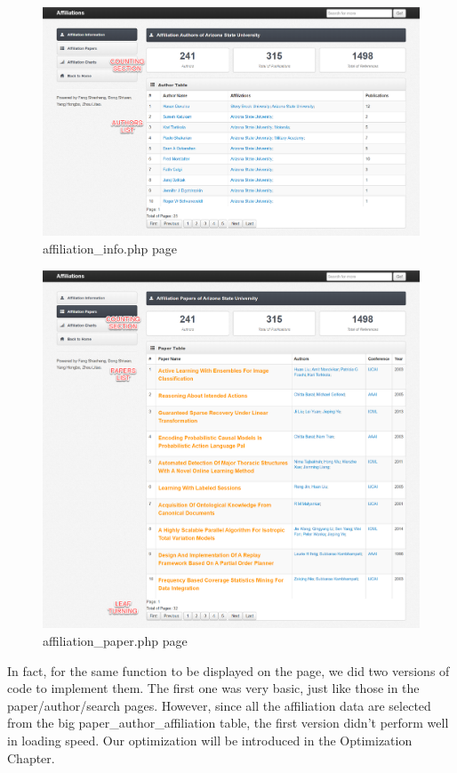 \documentclass{book}
\begin{document}
\begin{figure}[H]
\centering
\includegraphics[scale=0.35]{img/zlt_aff_demo1.png}
\caption{affiliation\_info.php page}
\end{figure}

\begin{figure}[H]
\centering
\includegraphics[scale=0.35]{img/zlt_aff_demo2.png}
\caption{affiliation\_paper.php page}
\end{figure}

In fact, for the same function to be displayed on the page, we did two versions of code to implement them. The first one was very basic, just like those in the paper/author/search pages. However, since all the affiliation data are selected from the big paper\_author\_affiliation table, the first version didn't perform well in loading speed. Our optimization will be introduced in the Optimization Chapter.
\end{document}
